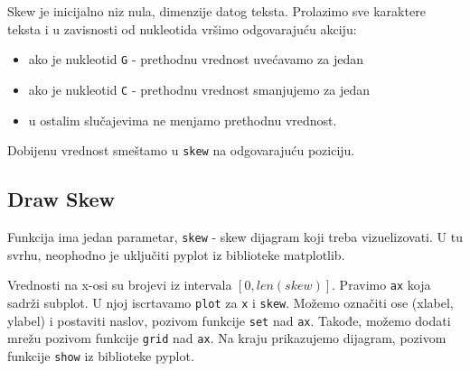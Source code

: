 Skew je inicijalno niz nula, dimenzije datog teksta. Prolazimo sve karaktere teksta i u zavisnosti od nukleotida vršimo odgovarajuću akciju:
\begin{itemize}
	\item ako je nukleotid \texttt{G} - prethodnu vrednost uvećavamo za jedan
	\item ako je nukleotid \texttt{C} - prethodnu vrednost smanjujemo za jedan
	\item u ostalim slučajevima ne menjamo prethodnu vrednost.
\end{itemize}

\noindent Dobijenu vrednost smeštamo u \texttt{skew} na odgovarajuću poziciju. 

\subsection{Draw Skew}

Funkcija ima jedan parametar, \texttt{skew} - skew dijagram koji treba vizuelizovati. U tu svrhu, neophodno je uključiti pyplot iz biblioteke matplotlib.

Vrednosti na x-osi su brojevi iz intervala $[0, len(skew)]$. Pravimo \texttt{ax} koja sadrži subplot. U njoj iscrtavamo \texttt{plot} za \texttt{x} i \texttt{skew}. Možemo označiti ose (xlabel, ylabel) i postaviti naslov, pozivom funkcije \texttt{set} nad \texttt{ax}. Takođe, možemo dodati mrežu pozivom funkcije \texttt{grid} nad \texttt{ax}. Na kraju prikazujemo dijagram, pozivom funkcije \texttt{show} iz biblioteke pyplot.










